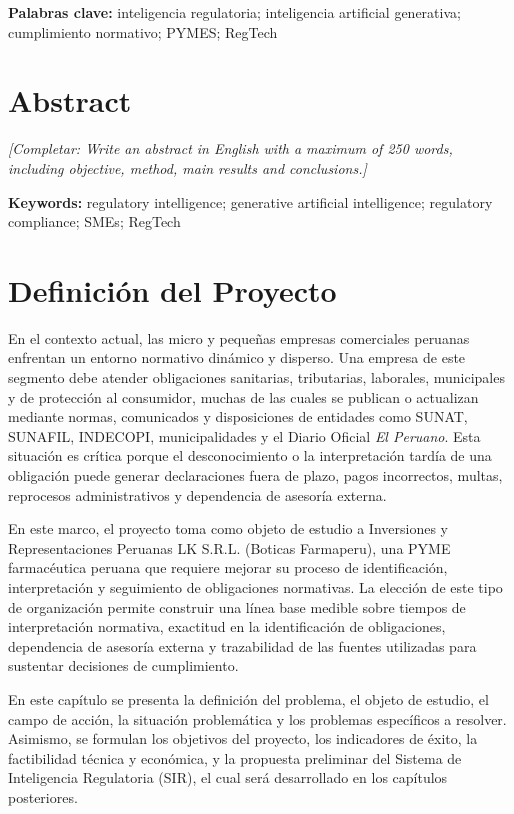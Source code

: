 \documentclass[12pt,a4paper,oneside]{report}
\newcommand{\placeholder}[1]{\textit{[Completar: #1]}}
\begin{document}
\noindent\textbf{Palabras clave:} inteligencia regulatoria; inteligencia artificial generativa; cumplimiento normativo; PYMES; RegTech

\chapter*{Abstract}
\placeholder{Write an abstract in English with a maximum of 250 words, including objective, method, main results and conclusions.}

\noindent\textbf{Keywords:} regulatory intelligence; generative artificial intelligence; regulatory compliance; SMEs; RegTech

\clearpage
\tableofcontents
\clearpage
\listoftables
\clearpage
\listoffigures
\clearpage
{}


\chapter{Definición del Proyecto}\label{cap:1-definicion-del-proyecto}

En el contexto actual, las micro y pequeñas empresas comerciales peruanas enfrentan un entorno normativo dinámico y disperso. Una empresa de este segmento debe atender obligaciones sanitarias, tributarias, laborales, municipales y de protección al consumidor, muchas de las cuales se publican o actualizan mediante normas, comunicados y disposiciones de entidades como SUNAT, SUNAFIL, INDECOPI, municipalidades y el Diario Oficial \textit{El Peruano}. Esta situación es crítica porque el desconocimiento o la interpretación tardía de una obligación puede generar declaraciones fuera de plazo, pagos incorrectos, multas, reprocesos administrativos y dependencia de asesoría externa.

En este marco, el proyecto toma como objeto de estudio a Inversiones y Representaciones Peruanas LK S.R.L. (Boticas Farmaperu), una PYME farmacéutica peruana que requiere mejorar su proceso de identificación, interpretación y seguimiento de obligaciones normativas. La elección de este tipo de organización permite construir una línea base medible sobre tiempos de interpretación normativa, exactitud en la identificación de obligaciones, dependencia de asesoría externa y trazabilidad de las fuentes utilizadas para sustentar decisiones de cumplimiento.

En este capítulo se presenta la definición del problema, el objeto de estudio, el campo de acción, la situación problemática y los problemas específicos a resolver. Asimismo, se formulan los objetivos del proyecto, los indicadores de éxito, la factibilidad técnica y económica, y la propuesta preliminar del Sistema de Inteligencia Regulatoria (SIR), el cual será desarrollado en los capítulos posteriores.
\end{document}
